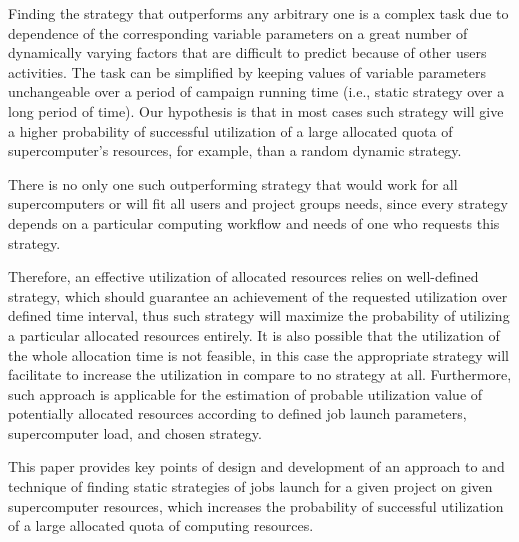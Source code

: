 Finding the strategy that outperforms any arbitrary one is a complex task due
to dependence of the corresponding variable parameters on a great number of
dynamically varying factors that are difficult to predict because of other
users activities.
The task can be simplified by keeping values of variable parameters unchangeable
over a period of campaign running time (i.e., static strategy over a long period
of time).
Our hypothesis is that in most cases such strategy will give a higher
probability of successful utilization of a large allocated quota of
supercomputer's resources, for example, than a random dynamic strategy.

There is no only one such outperforming strategy that would work for all
supercomputers or will fit all users and project groups needs, since every
strategy depends on a particular computing workflow and needs of one who
requests this strategy.

Therefore, an effective utilization of allocated resources relies on
well-defined strategy, which should guarantee an achievement of the requested
utilization over defined time interval, thus such strategy will maximize the
probability of utilizing a particular allocated resources entirely.
It is also possible that the utilization of the whole allocation time is not
feasible, in this case the appropriate strategy will facilitate to increase the
utilization in compare to no strategy at all.
Furthermore, such approach is applicable for the estimation of probable
utilization value of potentially allocated resources according to defined job
launch parameters, supercomputer load, and chosen strategy.

This paper provides key points of design and development of an approach to and
technique of finding static strategies of jobs launch for a given project on
given supercomputer resources, which increases the probability of successful
utilization of a large allocated quota of computing resources.
